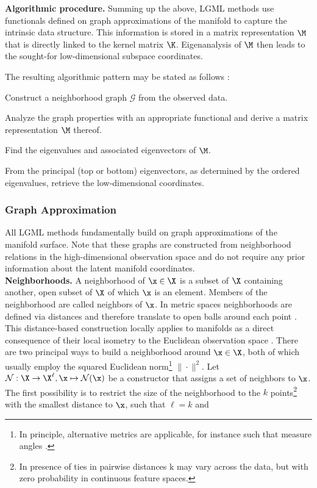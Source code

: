 \textbf{Algorithmic procedure.}
Summing up the above, LGML methods use functionals defined on graph 
approximations of the manifold to capture the intrinsic data structure.
This information is stored in a matrix representation $\M$ that is 
directly linked to the kernel matrix $\K$.
Eigenanalysis of $\M$ then leads to the sought-for low-dimensional subspace 
coordinates.

The resulting algorithmic pattern may be stated as follows 
\citep{bengioetal2003}:

\begin{tight_enumerate}
  \item Construct a neighborhood graph $\mathcal{G}$ from the observed data.
  \item Analyze the graph properties with an appropriate functional and derive 
  a matrix representation $\M$ thereof.
  \item Find the eigenvalues and associated eigenvectors of $\M$.
  \item From the principal (top or bottom) eigenvectors, as determined by the 
  ordered eigenvalues, retrieve the low-dimensional coordinates.
\end{tight_enumerate}


\subsubsection{Graph Approximation}
\label{graph}

All LGML methods fundamentally build on graph approximations of the 
manifold surface.
Note that these graphs are constructed from neighborhood relations in the 
high-dimensional observation space and do not require any prior information 
about the latent manifold coordinates.
\\

\textbf{Neighborhoods.} 
A neighborhood of $\x \in \X$ is a subset of $\X$ containing another, open 
subset of $\X$ of which $\x$ is an element.
Members of the neighborhood are called neighbors of $\x$.
In metric spaces neighborhoods are defined via distances and therefore 
translate to open balls around each point \citep{waldmann2014}.
This distance-based construction locally applies to manifolds as a direct 
consequence of their local isometry to the Euclidean observation space 
\citep{mafu2011}.
There are two principal ways to build a neighborhood around $\x \in \X$, 
both of which usually employ the squared Euclidean norm\footnote{
In principle, alternative metrics are applicable, for instance such 
that measure angles \citep{belkinniyogi2004}.
} $\| \cdot \|^2$.
Let $\mathcal{N}: \X \rightarrow \X^{\ell}, \x \mapsto \mathcal{N} (\x)$ be a 
constructor that assigns a set of neighbors to $\x$.
The first possibility is to restrict the size of the neighborhood to the $k$ 
points\footnote{
In presence of ties in pairwise distances k may vary across the data, but with 
zero probability in continuous feature spaces.
} with the smallest distance to $\x$, such that
$\ell = k$ and 

